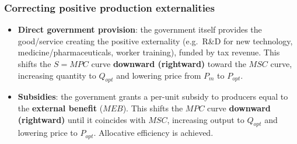 \subsubsection*{Correcting positive production externalities}
\begin{itemize}
  \item \textbf{Direct government provision}: the government itself provides the good/service creating the positive externality (e.g.\ R\&D for new technology, medicine/pharmaceuticals, worker training), funded by tax revenue. This shifts the $S = MPC$ curve \textbf{downward (rightward)} toward the $MSC$ curve, increasing quantity to $Q_{opt}$ and lowering price from $P_m$ to $P_{opt}$.
  \item \textbf{Subsidies}: the government grants a per-unit subsidy to producers equal to the \textbf{external benefit} ($MEB$). This shifts the $MPC$ curve \textbf{downward (rightward)} until it coincides with $MSC$, increasing output to $Q_{opt}$ and lowering price to $P_{opt}$. Allocative efficiency is achieved.
\end{itemize}
\begin{center}
\end{center}
